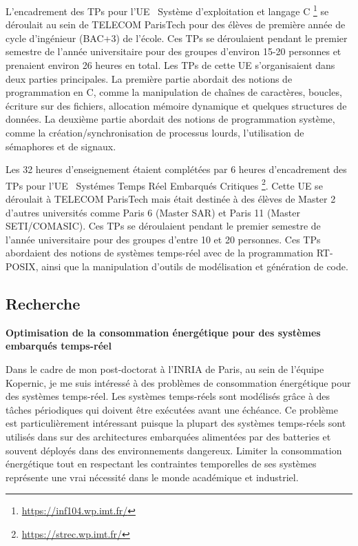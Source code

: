 \documentclass{article}
\begin{document}
L'encadrement des TPs pour l'UE \guillemotleft\ 
Système d'exploitation et langage C 
\guillemotright\footnote{\url{https://inf104.wp.imt.fr/}} se déroulait au sein de TELECOM ParisTech pour 
des 
élèves de première année de cycle d'ingénieur (BAC+3) de l'école. Ces TPs se déroulaient pendant le 
premier semestre de l'année universitaire pour des groupes d'environ 15-20 personnes et prenaient environ 
26 heures en total. Les TPs de cette UE s'organisaient dans deux parties principales. La première partie 
abordait des notions de programmation en C, comme la manipulation de chaînes de caractères, 
boucles, écriture sur des fichiers, allocation mémoire dynamique et quelques structures de données. La 
deuxième partie abordait des notions de programmation système, comme la création/synchronisation de 
processus lourds, l'utilisation de sémaphores et de signaux.
\vspace{.5cm}

Les 32 heures d'enseignement étaient complétées par 6 heures d'encadrement des TPs pour l'UE 
\guillemotleft\ Systémes Temps Réel Embarqués Critiques 
\guillemotright\footnote{\url{https://strec.wp.imt.fr/}}. Cette UE se déroulait à TELECOM ParisTech mais 
était destinée à des élèves de Master 2 d'autres universités comme Paris 6 (Master SAR) et Paris 11 (Master 
SETI/COMASIC). Ces TPs se déroulaient pendant le premier semestre de l'année universitaire pour des 
groupes d'entre 10 et 20 personnes. Ces TPs abordaient des notions de systèmes temps-réel avec de la 
programmation RT-POSIX, ainsi que la manipulation d'outils de modélisation et génération de code.

\subsection{Recherche}

\textbf{Optimisation de la consommation énergétique pour des systèmes embarqués temps-réel}

Dans le cadre de mon post-doctorat à l'INRIA de Paris, au sein de l'équipe Kopernic, je me suis intéressé à 
des problèmes de consommation énergétique pour des systèmes temps-réel. Les systèmes temps-réels 
sont modélisés grâce à des tâches périodiques qui doivent être exécutées avant une échéance. Ce problème 
est particulièrement intéressant puisque la plupart des systèmes temps-réels sont utilisés dans sur des 
architectures embarquées alimentées par des batteries et souvent déployés dans des environnements 
dangereux. Limiter la consommation énergétique tout en respectant les contraintes temporelles de ses 
systèmes représente une vrai nécessité dans le monde 
académique et industriel.
\end{document}
